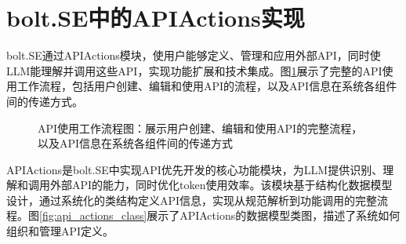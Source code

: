 \section{bolt.SE中的APIActions实现}
bolt.SE通过APIActions模块，使用户能够定义、管理和应用外部API，同时使LLM能理解并调用这些API，实现功能扩展和技术集成。图\ref{fig:api_workflow}展示了完整的API使用工作流程，包括用户创建、编辑和使用API的流程，以及API信息在系统各组件间的传递方式。

\begin{figure}
  \caption{API使用工作流程图：展示用户创建、编辑和使用API的完整流程，以及API信息在系统各组件间的传递方式}
  \label{fig:api_workflow}
\end{figure}

APIActions是bolt.SE中实现API优先开发的核心功能模块，为LLM提供识别、理解和调用外部API的能力，同时优化token使用效率。该模块基于结构化数据模型设计，通过系统化的类结构定义API信息，实现从规范解析到功能调用的完整流程。图\ref{fig:api_actions_class}展示了APIActions的数据模型类图，描述了系统如何组织和管理API定义。

